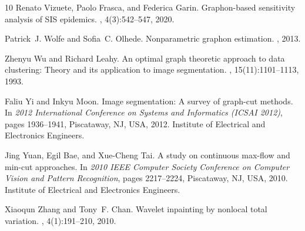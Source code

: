 \documentclass[11pt]{amsart}
\numberwithin{equation}{section}
\begin{document}
\begin{thebibliography}{10}
Renato Vizuete, Paolo Frasca, and Federica Garin.
\newblock Graphon-based sensitivity analysis of {SIS} epidemics.
, 4(3):542--547, 2020.

Patrick~J. Wolfe and Sofia~C. Olhede.
\newblock Nonparametric graphon estimation.
, 2013.

Zhenyu Wu and Richard Leahy.
\newblock An optimal graph theoretic approach to data clustering: {T}heory and
  its application to image segmentation.
,
  15(11):1101--1113, 1993.

Faliu Yi and Inkyu Moon.
\newblock Image segmentation: {A} survey of graph-cut methods.
\newblock In {\em 2012 International Conference on Systems and Informatics
  (ICSAI 2012)}, pages 1936--1941, Piscataway, NJ, USA, 2012. Institute of
  Electrical and Electronics Engineers.

Jing Yuan, Egil Bae, and Xue-Cheng Tai.
\newblock A study on continuous max-flow and min-cut approaches.
\newblock In {\em 2010 IEEE Computer Society Conference on Computer Vision and
  Pattern Recognition}, pages 2217--2224, Piscataway, NJ, USA, 2010. Institute
  of Electrical and Electronics Engineers.

Xiaoqun Zhang and Tony~F. Chan.
\newblock Wavelet inpainting by nonlocal total variation.
, 4(1):191--210, 2010.

\end{thebibliography}




\end{document}

